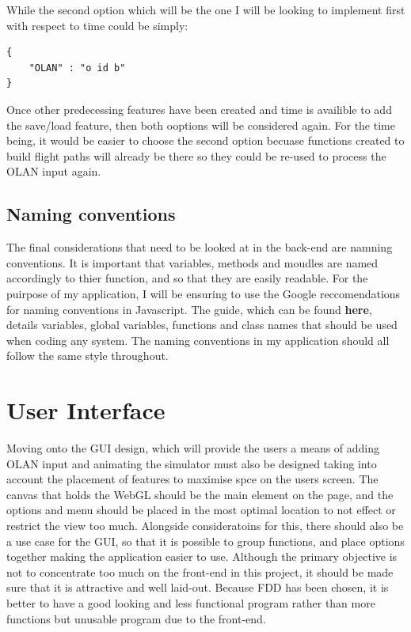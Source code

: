 While the second option which will be the one I will be looking to implement first with respect to time could be simply:

\lstset{language=JavaScript}
\medskip
\begin{lstlisting}[caption=A JSON means of holding break downs of manouvres with each one holding information on different varients of the move such as inverse and reverse and description of the OLAN notation]
{
	"OLAN" : "o id b"
}
\end{lstlisting}
\label{listing:json}

Once other predecessing features have been created and time is availible to add the save/load feature, then both ooptions will be considered again. For the time being, it would be easier to choose the second option becuase functions created to build flight paths will already be there so they could be re-used to process the OLAN input again.

\subsection{Naming conventions}
The final considerations that need to be looked at in the back-end are namning conventions. It is important that variables, methods and moudles are named accordingly to thier function, and so that they are easily readable. For the puirpose of my application, I will be ensuring to use the Google reccomendations for naming conventions in Javascript. The guide, which can be found \textbf{here}, details variables, global variables, functions and class names that should be used when coding any system. The naming conventions in my application should all follow the same style throughout.

\section{User Interface}
Moving onto the GUI design, which will provide the users a means of adding OLAN input and animating the simulator must also be designed taking into account the placement of features to maximise spce on the users screen. The canvas that holds the WebGL should be the main element on the page, and the options and menu should be placed in the most optimal location to not effect or restrict the view too much. Alongside consideratoins for this, there should also be a use case for the GUI, so that it is possible to group functions, and place options together making the application easier to use. Although the primary objective is not to concentrate too much on the front-end in this project, it should be made sure that it is attractive and well laid-out. Because FDD has been chosen, it is better to have a good looking and less functional program rather than more functions but unusable program due to the front-end.

